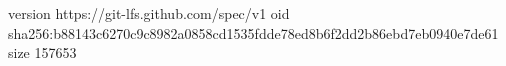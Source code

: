 version https://git-lfs.github.com/spec/v1
oid sha256:b88143c6270c9c8982a0858cd1535fdde78ed8b6f2dd2b86ebd7eb0940e7de61
size 157653
